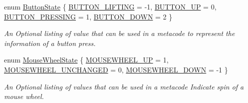 \begin{DoxyCompactItemize}
enum \hyperlink{classphys_1_1MetaCode_a2fdfb26b3e50ceb0ccc60bfc4c3d6ac2}{ButtonState} \{ \hyperlink{classphys_1_1MetaCode_a2fdfb26b3e50ceb0ccc60bfc4c3d6ac2a6b5564408703517f36debd8c423e2dee}{BUTTON\_\-LIFTING} =  -\/1, 
\hyperlink{classphys_1_1MetaCode_a2fdfb26b3e50ceb0ccc60bfc4c3d6ac2ae275c52779b0f6ec37533af256a70cc3}{BUTTON\_\-UP} =  0, 
\hyperlink{classphys_1_1MetaCode_a2fdfb26b3e50ceb0ccc60bfc4c3d6ac2a33669b2b9ca814664296da55702e412d}{BUTTON\_\-PRESSING} =  1, 
\hyperlink{classphys_1_1MetaCode_a2fdfb26b3e50ceb0ccc60bfc4c3d6ac2a5b52ee1db94dbc2db23f3b4c267b5438}{BUTTON\_\-DOWN} =  2
 \}
\begin{DoxyCompactList}\small\item\em An Optional listing of value that can be used in a metacode to represent the information of a button press. \item\end{DoxyCompactList}\item 
enum \hyperlink{classphys_1_1MetaCode_af9ba277d1ef071be8861e35c2b7d82d6}{MouseWheelState} \{ \hyperlink{classphys_1_1MetaCode_af9ba277d1ef071be8861e35c2b7d82d6a15542262fc8fe9a3d6746f2b84ecde11}{MOUSEWHEEL\_\-UP} =  1, 
\hyperlink{classphys_1_1MetaCode_af9ba277d1ef071be8861e35c2b7d82d6aa3d86fe74d1c191d7c57f886c0b8d99a}{MOUSEWHEEL\_\-UNCHANGED} =  0, 
\hyperlink{classphys_1_1MetaCode_af9ba277d1ef071be8861e35c2b7d82d6ab6edd0886d2ec2d2917bbad96ce3d510}{MOUSEWHEEL\_\-DOWN} =  -\/1
 \}
\begin{DoxyCompactList}\small\item\em An Optional listing of values that can be used in a metacode Indicate spin of a mouse wheel. \item\end{DoxyCompactList}\end{DoxyCompactItemize}
